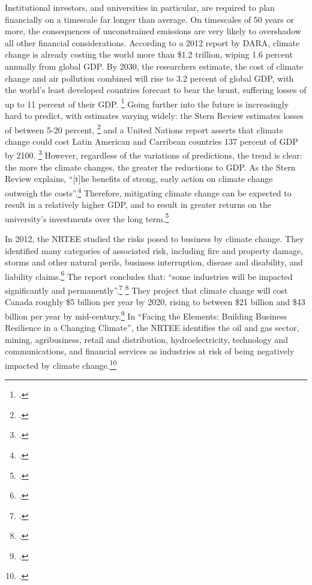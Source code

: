 \documentclass[10pt]{article}
\begin{document}
Institutional investors, and universities in particular, are required to plan financially on a timescale far longer than average. 
On timescales of 50 years or more, the consequences of unconstrained emissions are very likely to overshadow all other financial considerations.
According to a 2012 report by DARA, climate change is already costing the world more than \$1.2 trillion, wiping 1.6 percent annually from global GDP.
By 2030, the researchers estimate, the cost of climate change and air pollution combined will rise to 3.2 percent of global GDP, with the world's least developed countries forecast to bear the brunt, suffering losses of up to 11 percent of their GDP. \footcite{DARACVM}
Going further into the future is increasingly hard to predict, with estimates varying widely: the Stern Review estimates losses of between 5-20 percent, \footcite{Stern2007} and a United Nations report asserts that climate change could cost Latin American and Carribean countries 137 percent of GDP by 2100. \footcite{CCLatinAmerica}
However, regardless of the variations of predictions, the trend is clear: the more the climate changes, the greater the reductions to GDP.
As the Stern Review explains, ``[t]he benefits of strong, early action on climate change outweigh the costs''.\footcite[][Executive summary at: \url{http://www.hm-treasury.gov.uk/d/Executive_Summary.pdf}]{Stern2007}
Therefore, mitigating climate change can be expected to result in a relatively higher GDP, and to result in greater returns on the university's investments over the long term.\footcite[See also: ][]{EconomicCase}



In 2012, the NRTEE studied the risks posed to business by climate change.
They identified many categories of associated risk, including fire and property damage, storms and other natural perils, business interruption, disease and disability, and liability claims.\footcite[][p. 3]{ManagingBusinessRisks}
The report concludes that: ``some industries will be impacted significantly and permanently''.\footcite[][p. 2]{ManagingBusinessRisks} \footcite[See also: ][]{LeveragingInvestmentsCScience}
They project that climate change will cost Canada roughly \$5 billion per year by 2020, rising to between \$21 billion and \$43 billion per year by mid-century.\footcite[][p. 2]{ManagingBusinessRisks}
In ``Facing the Elements: Building Business Resilience in a Changing Climate'', the NRTEE identifies the oil and gas sector, mining, agribusiness, retail and distribution, hydroelectricity, technology and communications, and financial services as industries at risk of being negatively impacted by climate change.\footcite[][p. 9--10]{FacingTheElements}
\end{document}
